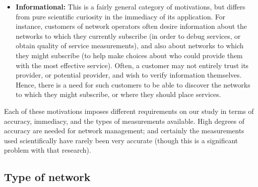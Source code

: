 \begin{itemize}
\item {\bf Informational:} This is a fairly general category of
  motivations, but differs from pure scientific curiosity in the
  immediacy of its application. For instance, customers of network
  operators often desire information about the networks to which they
  currently subscribe (in order to debug services, or obtain quality
  of service measurements), and also about networks to which they
  might subscribe (to help make choices about who could provide them
  with the most effective service). Often, a customer may not entirely
  trust its provider, or potential provider, and wish to verify
  information themselves. Hence, there is a need for such customers to
  be able to discover the networks to which they might subscribe, or
  where they should place services.

\end{itemize}
Each of these motivations imposes different requirements on our study
in terms of accuracy, immediacy, and the types of measurements
available. High degrees of accuracy are needed for network management;
and certainly the measurements used scientifically have rarely been
very accurate (though this is a significant problem with that
research). 

\subsection{Type of network}

